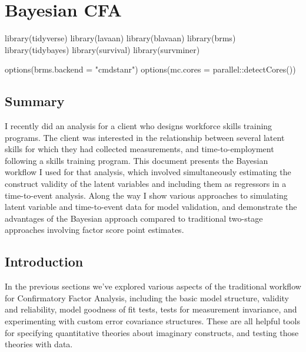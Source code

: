 \documentclass[
  letterpaper,
  DIV=11,
  numbers=noendperiod]{scrreprt}
\newenvironment{Shaded}{\begin{snugshade}}{\end{snugshade}}
\newcommand{\AttributeTok}[1]{\textcolor[rgb]{0.40,0.45,0.13}{#1}}
\newcommand{\FunctionTok}[1]{\textcolor[rgb]{0.28,0.35,0.67}{#1}}
\newcommand{\NormalTok}[1]{\textcolor[rgb]{0.00,0.23,0.31}{#1}}
\newcommand{\SpecialCharTok}[1]{\textcolor[rgb]{0.37,0.37,0.37}{#1}}
\newcommand{\StringTok}[1]{\textcolor[rgb]{0.13,0.47,0.30}{#1}}
\begin{document}
\hypertarget{bayesian-cfa}{%
\chapter{Bayesian CFA}\label{bayesian-cfa}}

\begin{Shaded}
\begin{Highlighting}[]
\FunctionTok{library}\NormalTok{(tidyverse)}
\FunctionTok{library}\NormalTok{(lavaan)}
\FunctionTok{library}\NormalTok{(blavaan)}
\FunctionTok{library}\NormalTok{(brms)}
\FunctionTok{library}\NormalTok{(tidybayes)}
\FunctionTok{library}\NormalTok{(survival)}
\FunctionTok{library}\NormalTok{(survminer)}

\FunctionTok{options}\NormalTok{(}\AttributeTok{brms.backend =} \StringTok{"cmdstanr"}\NormalTok{)}
\FunctionTok{options}\NormalTok{(}\AttributeTok{mc.cores =}\NormalTok{ parallel}\SpecialCharTok{::}\FunctionTok{detectCores}\NormalTok{())}
\end{Highlighting}
\end{Shaded}

\hypertarget{summary}{%
\section*{Summary}\label{summary}}

I recently did an analysis for a client who designs workforce skills
training programs. The client was interested in the relationship between
several latent skills for which they had collected measurements, and
time-to-employment following a skills training program. This document
presents the Bayesian workflow I used for that analysis, which involved
simultaneously estimating the construct validity of the latent variables
and including them as regressors in a time-to-event analysis. Along the
way I show various approaches to simulating latent variable and
time-to-event data for model validation, and demonstrate the advantages
of the Bayesian approach compared to traditional two-stage approaches
involving factor score point estimates.

\hypertarget{introduction}{%
\section*{Introduction}\label{introduction}}

In the previous sections we've explored various aspects of the
traditional workflow for Confirmatory Factor Analysis, including the
basic model structure, validity and reliability, model goodness of fit
tests, tests for measurement invariance, and experimenting with custom
error covariance structures. These are all helpful tools for specifying
quantitative theories about imaginary constructs, and testing those
theories with data.
\end{document}
